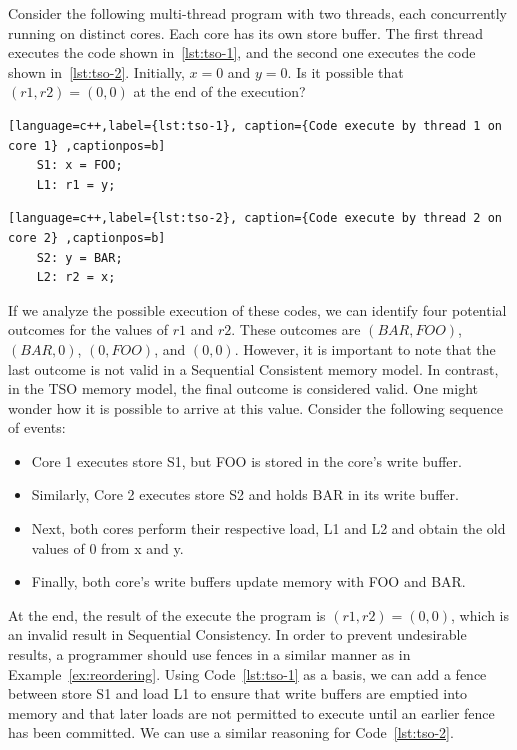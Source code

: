 \begin{example}
  \label{ex:tso-problem}

  Consider the following multi-thread program with two threads, each concurrently running on distinct cores. Each core has its own store buffer. The first thread executes the code shown in~\ref{lst:tso-1}, and the second one executes the code shown in~\ref{lst:tso-2}. Initially, \(x = 0\) and \(y = 0\). Is it possible that \((r1, r2) = (0, 0)\) at the end of the execution?

  \begin{lstlisting}[language=c++,label={lst:tso-1}, caption={Code execute by thread 1 on core 1} ,captionpos=b]
    S1: x = FOO;
    L1: r1 = y;
\end{lstlisting}

\begin{lstlisting}[language=c++,label={lst:tso-2}, caption={Code execute by thread 2 on core 2} ,captionpos=b]
    S2: y = BAR;
    L2: r2 = x;
\end{lstlisting}

  If we analyze the possible execution of these codes, we can identify four potential outcomes for the values of \(r1\) and \(r2\). These outcomes are \((BAR, FOO)\), \((BAR, 0)\), \((0, FOO)\), and \((0, 0)\). However, it is important to note that the last outcome is not valid in a Sequential Consistent memory model. In contrast, in the TSO memory model, the final outcome is considered valid. One might wonder how it is possible to arrive at this value. Consider the following sequence of events:

  \begin{itemize}
    \item Core 1 executes store S1, but FOO is stored in the core's write buffer.
    \item Similarly, Core 2 executes store S2 and holds BAR in its write buffer.
    \item Next, both cores perform their respective load, L1 and L2 and obtain the old values of 0 from x and y.
    \item Finally, both core's write buffers update memory with FOO and BAR.
    \end{itemize}

    At the end, the result of the execute the program is \((r1, r2) = (0, 0)\), which is an invalid result in Sequential Consistency. In order to prevent undesirable results, a programmer should use fences in a similar manner as in Example~\ref{ex:reordering}. Using Code~\ref{lst:tso-1} as a basis, we can add a fence between store S1 and load L1 to ensure that write buffers are emptied into memory and that later loads are not permitted to execute until an earlier fence has been committed. We can use a similar reasoning for Code~\ref{lst:tso-2}.

\end{example}

